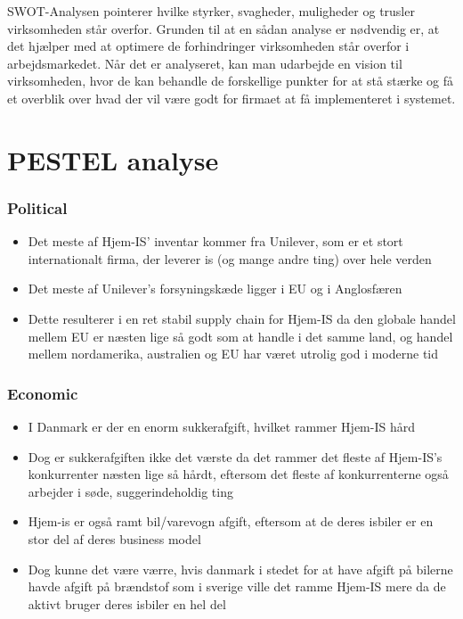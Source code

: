 SWOT-Analysen pointerer hvilke styrker, svagheder, muligheder og trusler virksomheden står overfor. Grunden til at en sådan analyse er nødvendig er, at det hjælper med at optimere de forhindringer virksomheden står overfor i arbejdsmarkedet. Når det er analyseret, kan man udarbejde en vision til virksomheden, hvor de kan behandle de forskellige punkter for at stå stærke og få et overblik over hvad der vil være godt for firmaet at få implementeret i systemet.

\section{PESTEL analyse}
\subsubsection{Political}
\begin{itemize}
    \item Det meste af Hjem-IS’ inventar kommer fra Unilever, som er et stort internationalt firma, der leverer is (og mange andre ting) over hele verden
    \item Det meste af Unilever’s forsyningskæde ligger i EU og i Anglosfæren
    \item Dette resulterer i en ret stabil supply chain for Hjem-IS da den globale handel mellem EU er næsten lige så godt som at handle i det samme land, og handel mellem nordamerika, australien og EU har været utrolig god i moderne tid
\end{itemize}
\subsubsection{Economic}
\begin{itemize}
    \item I Danmark er der en enorm sukkerafgift, hvilket rammer Hjem-IS hård
    \item Dog er sukkerafgiften ikke det værste da det rammer det fleste af Hjem-IS’s konkurrenter næsten lige så hårdt, eftersom det fleste af konkurrenterne også arbejder i søde, suggerindeholdig ting
    \item Hjem-is er også ramt bil/varevogn afgift, eftersom at de deres isbiler er en stor del af deres business model
    \item Dog kunne det være værre, hvis danmark i stedet for at have afgift på bilerne havde afgift på brændstof som i sverige ville det ramme Hjem-IS mere da de aktivt bruger deres isbiler en hel del
\end{itemize}
